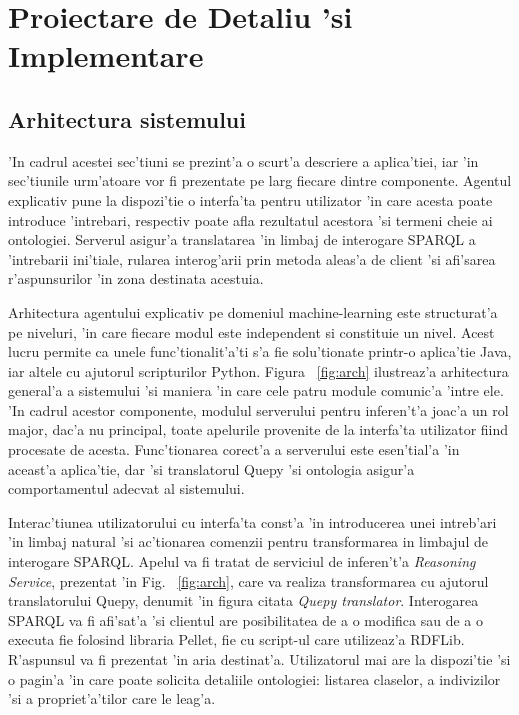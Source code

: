 \documentclass[12pt,a4paper,twoside]{report}
\begin{document}
\chapter{Proiectare de Detaliu 'si Implementare}

\section{Arhitectura sistemului}

'In cadrul acestei sec'tiuni se prezint'a o scurt'a descriere a aplica'tiei, iar 'in sec'tiunile urm'atoare vor fi prezentate pe larg fiecare dintre componente. Agentul explicativ pune la dispozi'tie o interfa'ta pentru utilizator 'in care acesta poate introduce 'intrebari, respectiv poate afla rezultatul acestora 'si termeni cheie ai ontologiei. Serverul asigur'a translatarea 'in limbaj de interogare SPARQL a 'intrebarii ini'tiale, rularea interog'arii prin metoda aleas'a de client 'si afi'sarea r'aspunsurilor 'in zona destinata acestuia.

Arhitectura agentului explicativ pe domeniul machine-learning este structurat'a pe niveluri, 'in care fiecare modul este independent si constituie un nivel. Acest lucru permite ca unele func'tionalit'a'ti s'a fie solu'tionate printr-o aplica'tie Java, iar altele cu ajutorul scripturilor Python. Figura ~\ref{fig:arch} ilustreaz'a arhitectura general'a a sistemului 'si maniera 'in care cele patru module comunic'a 'intre ele. 'In cadrul acestor componente, modulul serverului pentru inferen't'a joac'a un rol major, dac'a nu principal, toate apelurile provenite de la interfa'ta utilizator fiind procesate de acesta. Func'tionarea corect'a a serverului este esen'tial'a 'in aceast'a aplica'tie, dar 'si translatorul Quepy 'si ontologia asigur'a comportamentul adecvat al sistemului.

Interac'tiunea utilizatorului cu interfa'ta const'a 'in introducerea unei intreb'ari 'in limbaj natural 'si ac'tionarea comenzii pentru transformarea in limbajul de interogare SPARQL. Apelul va fi tratat de serviciul de inferen't'a {\it Reasoning Service}, prezentat 'in Fig. ~\ref{fig:arch}, care va realiza transformarea cu ajutorul translatorului Quepy, denumit 'in figura citata {\it Quepy translator}. Interogarea SPARQL va fi afi'sat'a 'si clientul are posibilitatea de a o modifica sau de a o executa fie folosind libraria Pellet, fie cu script-ul care utilizeaz'a RDFLib. R'aspunsul va fi prezentat 'in aria destinat'a. Utilizatorul mai are la dispozi'tie 'si o pagin'a 'in care poate solicita detaliile ontologiei: listarea claselor, a indivizilor 'si a propriet'a'tilor care le leag'a.
\end{document}

